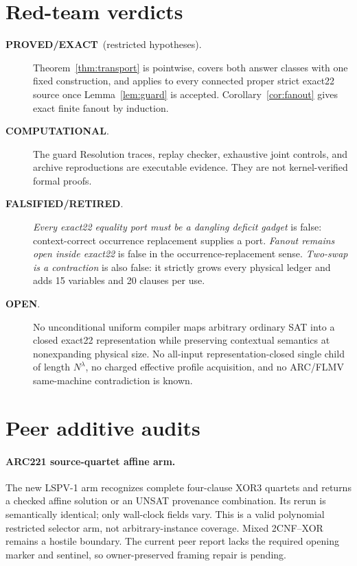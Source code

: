 \documentclass[11pt]{article}
\newcommand{\PROVED}{\textbf{PROVED/EXACT}}
\newcommand{\COMP}{\textbf{COMPUTATIONAL}}
\newcommand{\OPEN}{\textbf{OPEN}}
\newcommand{\FALSE}{\textbf{FALSIFIED/RETIRED}}
\begin{document}
\section{Red-team verdicts}
\begin{description}
\item[\PROVED\ (restricted hypotheses).]
Theorem~\ref{thm:transport} is pointwise, covers both answer classes with one
fixed construction, and applies to every connected proper strict exact22
source once Lemma~\ref{lem:guard} is accepted.  Corollary~\ref{cor:fanout}
gives exact finite fanout by induction.
\item[\COMP.]
The guard Resolution traces, replay checker, exhaustive joint controls, and
archive reproductions are executable evidence.  They are not kernel-verified
formal proofs.
\item[\FALSE.]
\emph{Every exact22 equality port must be a dangling deficit gadget} is
false: context-correct occurrence replacement supplies a port.
\emph{Fanout remains open inside exact22} is false in the
occurrence-replacement sense.  \emph{Two-swap is a contraction} is also false:
it strictly grows every physical ledger and adds 15 variables and 20 clauses
per use.
\item[\OPEN.]
No unconditional uniform compiler maps arbitrary ordinary SAT into a closed
exact22 representation while preserving contextual semantics at nonexpanding
physical size.  No all-input representation-closed single child of length
\(N^\lambda\), no charged effective profile acquisition, and no ARC/FLMV
same-machine contradiction is known.
\end{description}

\section{Peer additive audits}
\paragraph{ARC221 source-quartet affine arm.}
The new LSPV-1 arm recognizes complete four-clause XOR3 quartets and returns
a checked affine solution or an UNSAT provenance combination.  Its rerun is
semantically identical; only wall-clock fields vary.  This is a valid
polynomial restricted selector arm, not arbitrary-instance coverage.  Mixed
2CNF--XOR remains a hostile boundary.  The current peer report lacks the
required opening marker and sentinel, so owner-preserved framing repair is
pending.
\end{document}
